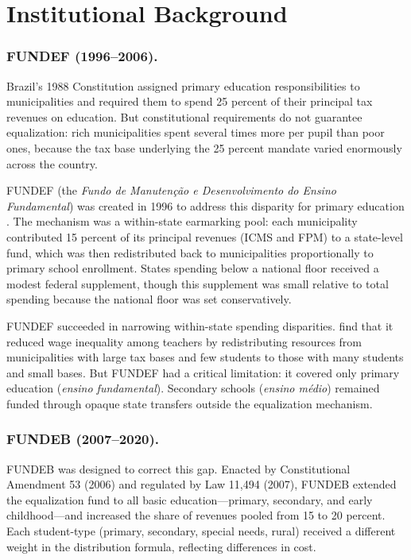 \documentclass[12pt]{article}
\begin{document}
\section{Institutional Background}

\subsubsection*{FUNDEF (1996--2006).} Brazil's 1988 Constitution assigned primary
education responsibilities to municipalities and required them to spend 25 percent of
their principal tax revenues on education. But constitutional requirements do not
guarantee equalization: rich municipalities spent several times more per pupil than poor
ones, because the tax base underlying the 25 percent mandate varied enormously across
the country.

FUNDEF (the \textit{Fundo de Manuten\c{c}\~ao e Desenvolvimento do Ensino Fundamental})
was created in 1996 to address this disparity for primary education
\citep{menezes2007}. The mechanism was a within-state earmarking pool: each municipality
contributed 15 percent of its principal revenues (ICMS and FPM) to a state-level fund,
which was then redistributed back to municipalities proportionally to primary school
enrollment. States spending below a national floor received a modest federal supplement,
though this supplement was small relative to total spending because the national floor
was set conservatively.

FUNDEF succeeded in narrowing within-state spending disparities. \citet{ferraz2012}
find that it reduced wage inequality among teachers by redistributing resources from
municipalities with large tax bases and few students to those with many students and
small bases. But FUNDEF had a critical limitation: it covered only primary education
(\textit{ensino fundamental}). Secondary schools (\textit{ensino m\'edio}) remained
funded through opaque state transfers outside the equalization mechanism.

\subsubsection*{FUNDEB (2007--2020).} FUNDEB was designed to correct this gap.
Enacted by Constitutional Amendment 53 (2006) and regulated by Law 11,494 (2007),
FUNDEB extended the equalization fund to all basic education---primary, secondary, and
early childhood---and increased the share of revenues pooled from 15 to 20 percent.
Each student-type (primary, secondary, special needs, rural) received a different
weight in the distribution formula, reflecting differences in cost.
\end{document}
